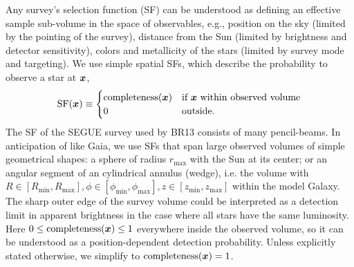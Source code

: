 Any survey's selection function (SF) can be understood as defining an effective sample sub-volume in the space of observables, e.g., position on the sky (limited by the pointing of the survey), distance from the Sun (limited by brightness and detector sensitivity), colors and metallicity of the stars (limited by survey mode and targeting). We use simple spatial SFs, which describe the probability to observe a star at $\boldsymbol{x}$,
\begin{eqnarray*}
\text{SF}(\boldsymbol{x}) \equiv \begin{cases}
\text{completeness}(\boldsymbol{x}) &\text{if $\boldsymbol{x}$ within observed volume}\\
0 & \text{outside.}
\end{cases}
\end{eqnarray*}
The SF of the SEGUE survey  used by BR13 consists of many pencil-beams. In anticipation of  like Gaia, we use SFs that span large observed volumes of simple geometrical shapes: a sphere of radius $r_\text{max}$ with the Sun at its center; or an angular segment of an cylindrical annulus (wedge), i.e. the volume with $R \in [R_\text{min},R_\text{max}],\phi \in [\phi_\text{min},\phi_\text{max}],z \in [z_\text{min},z_\text{max}]$ within the model Galaxy. The sharp outer edge of the survey volume could be interpreted as a detection limit in apparent brightness in the case where all stars have the same luminosity. Here $0 \leq \text{completeness}(\boldsymbol{x}) \leq 1$ everywhere inside the observed volume, so it can be understood as a position-dependent detection probability. Unless explicitly stated otherwise, we simplify to $\text{completeness}(\boldsymbol{x}) = 1$.

